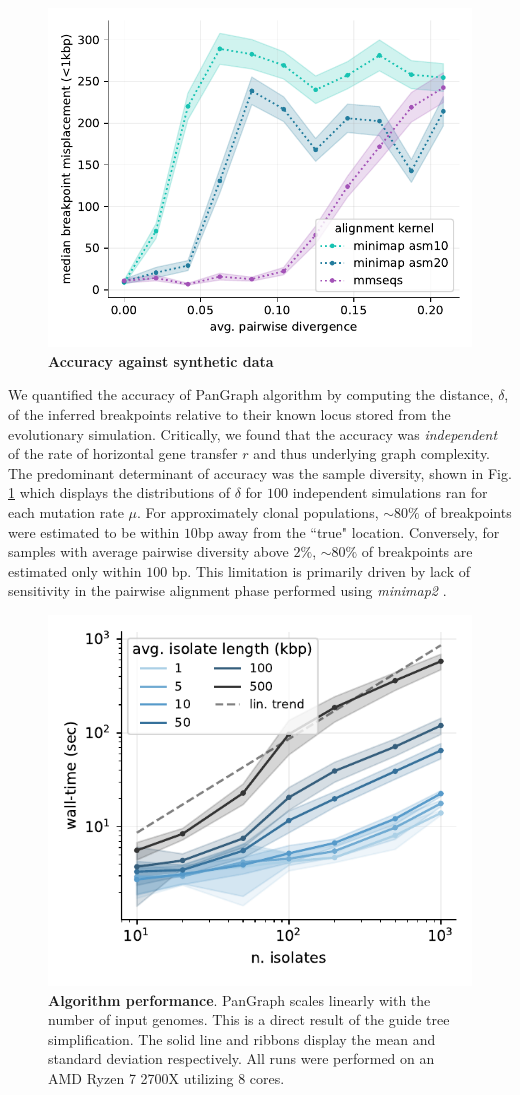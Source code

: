 \documentclass[aps,rmp,reprint,superscriptaddress,notitlepage,10pt]{revtex4-1}
\begin{document}
\begin{figure}[htb]
    \includegraphics[width=.4\textwidth]{figs/median_misplacement_vs_divergence.pdf}
    \caption{{\bf Accuracy against synthetic data}}
    \label{fig:toy-accuracy}
\end{figure}

We quantified the accuracy of PanGraph algorithm by computing the distance, $\delta$, of the inferred breakpoints relative to their known locus stored from the evolutionary simulation.
Critically, we found that the accuracy was \emph{independent} of the rate of horizontal gene transfer $r$ and thus underlying graph complexity.
The predominant determinant of accuracy was the sample diversity, shown in Fig. \ref{fig:toy-accuracy} which displays the distributions of $\delta$ for $100$ independent simulations ran for each mutation rate $\mu$.
For approximately clonal populations, $\sim 80\%$ of breakpoints were estimated to be within $10$bp away from the ``true" location.
Conversely, for samples with average pairwise diversity above $2\%$, $\sim 80\%$ of breakpoints are estimated only within $100$ bp.
This limitation is primarily driven by lack of sensitivity in the pairwise alignment phase performed using \emph{minimap2} \cite{li2018minimap2}.

\begin{figure}[htb]
    \includegraphics[width=.4\textwidth]{benchmark.pdf}
    \caption{{\bf Algorithm performance}.
        PanGraph scales linearly with the number of input genomes.
        This is a direct result of the guide tree simplification.
        The solid line and ribbons display the mean and standard deviation respectively.
        All runs were performed on an AMD Ryzen 7 2700X utilizing 8 cores.
    }
    \label{fig:toy-performance}
\end{figure}
\end{document}
